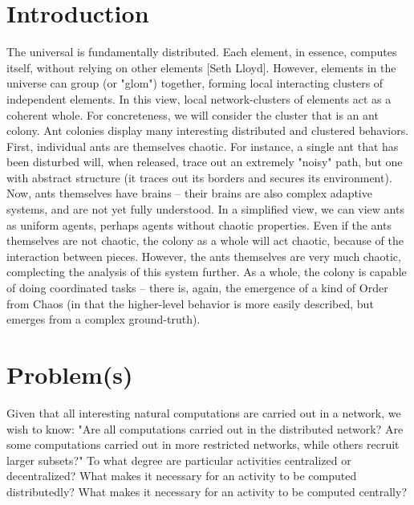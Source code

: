 \documentclass{nature}
\begin{document}
\section{Introduction}

The universal is fundamentally distributed.
Each element, in essence, computes itself, without relying on other elements [Seth Lloyd].
However, elements in the universe can group (or "glom") together, forming local interacting clusters of independent elements.
In this view, local network-clusters of elements act as a coherent whole.
For concreteness, we will consider the cluster that is an ant colony. 
Ant colonies display many interesting distributed and clustered behaviors.
First, individual ants are themselves chaotic. 
For instance, a single ant that has been disturbed will, when released, trace out an extremely "noisy" path, but one with abstract structure (it traces out its borders and secures its environment).
Now, ants themselves have brains -- their brains are also complex adaptive systems, and are not yet fully understood. 
In a simplified view, we can view ants as uniform agents, perhaps agents without chaotic properties.
Even if the ants themselves are not chaotic, the colony as a whole will act chaotic, because of the interaction between pieces.
However, the ants themselves are very much chaotic, complecting the analysis of this system further.
As a whole, the colony is capable of doing coordinated tasks -- there is, again, the emergence of a kind of Order from Chaos (in that the higher-level behavior is more easily described, but emerges from a complex ground-truth). 

\section{Problem(s)}

Given that all interesting natural computations are carried out in a network, we wish to know: 
"Are all computations carried out in the distributed network? Are some computations carried out in more restricted networks, while others recruit larger subsets?"
To what degree are particular activities centralized or decentralized?
What makes it necessary for an activity to be computed distributedly?
What makes it necessary for an activity to be computed centrally?
\end{document}
